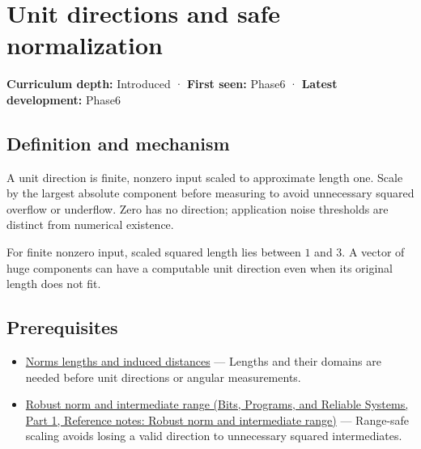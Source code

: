 \hypertarget{appendix-f744e41b95b4}{}\label{referencestart:appendix-f744e41b95b4}
\section{Unit directions and safe normalization}\label{appendix-f744e41b95b4-unit-directions-and-safe-normalization}

\hypertarget{appendix-f744e41b95b4-unit-directions-and-safe-normalization}{}

\textbf{Curriculum depth:} Introduced · \textbf{First seen:} Phase6 · \textbf{Latest development:} Phase6

\begin{allmightroledefinition}

\subsection{Definition and mechanism}\label{appendix-f744e41b95b4-definition-and-mechanism}

\hypertarget{appendix-f744e41b95b4-definition-and-mechanism}{}

A unit direction is finite, nonzero input scaled to approximate length one. Scale by the largest absolute component before measuring to avoid unnecessary squared overflow or underflow. Zero has no direction; application noise thresholds are distinct from numerical existence.

\end{allmightroledefinition}

For finite nonzero input, scaled squared length lies between \(1\) and \(3\). A vector of huge components can have a computable unit direction even when its original length does not fit.

\subsection{Prerequisites}\label{appendix-f744e41b95b4-prerequisites}

\hypertarget{appendix-f744e41b95b4-prerequisites}{}

\begin{itemize}
\tightlist
\item
  \hyperref[appendix-49933872bb51]{Norms lengths and induced distances} --- Lengths and their domains are needed before unit directions or angular measurements.
\item
  \href{../01-Bits-Programs-and-Reliable-Systems-P01/main.pdf\#appendix-7f1e17dcafb1}{Robust norm and intermediate range (Bits, Programs, and Reliable Systems, Part 1, Reference notes: Robust norm and intermediate range)} --- Range-safe scaling avoids losing a valid direction to unnecessary squared intermediates.
\end{itemize}

